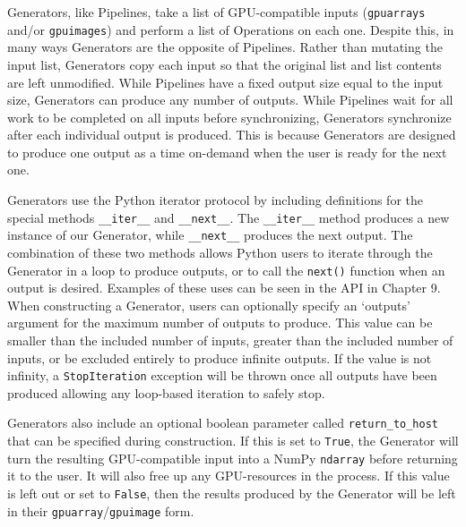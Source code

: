 Generators, like Pipelines, take a list of GPU-compatible inputs (\verb|gpuarrays| and/or \verb|gpuimages|) and perform a list of Operations on each one. Despite this, in many ways Generators are the opposite of Pipelines. Rather than mutating the input list, Generators copy each input so that the original list and list contents are left unmodified. While Pipelines have a fixed output size equal to the input size, Generators can produce any number of outputs. While Pipelines wait for all work to be completed on all inputs before synchronizing, Generators synchronize after each individual output is produced. This is because Generators are designed to produce one output as a time on-demand when the user is ready for the next one.

\quad Generators use the Python iterator protocol by including definitions for the special methods \verb|__iter__| and \verb|__next__|. The \verb|__iter__| method produces a new instance of our Generator, while \verb|__next__| produces the next output. The combination of these two methods allows Python users to iterate through the Generator in a loop to produce outputs, or to call the \verb|next()| function when an output is desired. Examples of these uses can be seen in the API in Chapter 9. When constructing a Generator, users can optionally specify an `outputs' argument for the maximum number of outputs to produce. This value can be smaller than the included number of inputs, greater than the included number of inputs, or be excluded entirely to produce infinite outputs. If the value is not infinity, a \verb|StopIteration| exception will be thrown once all outputs have been produced allowing any loop-based iteration to safely stop. 

\quad Generators also include an optional boolean parameter called \verb|return_to_host| that can be specified during construction. If this is set to \verb|True|, the Generator will turn the resulting GPU-compatible input into a NumPy \verb|ndarray| before returning it to the user. It will also free up any GPU-resources in the process. If this value is left out or set to \verb|False|, then the results produced by the Generator will be left in their \verb|gpuarray|/\verb|gpuimage| form.
